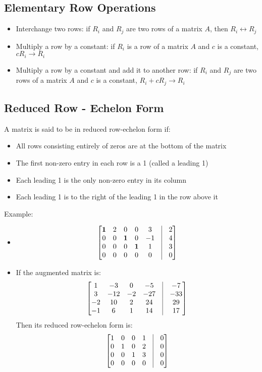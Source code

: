 \documentclass{article}
\begin{document}
\subsection*{Elementary Row Operations}
\begin{itemize}
    \item Interchange two rows: if $R_i$ and $R_j$ are two rows of a matrix $A$, then $R_i \leftrightarrow R_j$ 
    \item Multiply a row by a constant: if $R_i$ is a row of a matrix $A$ and $c$ is a constant, $cR_i \rightarrow R_i$
    \item Multiply a row by a constant and add it to another row: if $R_i$ and $R_j$ are two rows of a matrix $A$ and $c$ is a constant, $R_i + cR_j \rightarrow R_i$
\end{itemize}

\subsection*{Reduced Row - Echelon Form}
A matrix is said to be in reduced row-echelon form if:
\begin{itemize}
    \item All rows consisting entirely of zeros are at the bottom of the matrix
    \item The first non-zero entry in each row is a 1 (called a leading 1)
    \item Each leading 1 is the only non-zero entry in its column
    \item Each leading 1 is to the right of the leading 1 in the row above it
\end{itemize}
Example:
\begin{itemize}
    \item \[\begin{bmatrix}
    \textbf{1} & 2 & 0 & 0 & 3 & \vline & 2 \\
    0 & 0 & \textbf{1} & 0 & -1 & \vline & 4\\
    0 & 0 & 0 & \textbf{1} & 1 & \vline & 3 \\
    0 & 0 & 0 & 0 & 0 & \vline & 0
    \end{bmatrix}\]
    \item If the augmented matrix is: 
    \[\begin{bmatrix}
        1 & -3 & 0 & -5 & \vline & -7 \\
        3 & -12 & -2 & -27 & \vline & -33 \\
        -2 & 10 & 2 & 24 & \vline & 29 \\
        -1 & 6 & 1 & 14 & \vline & 17 \\
    \end{bmatrix}\]
    Then its reduced row-echelon form is:
    \[\begin{bmatrix}
        1 & 0 & 0 & 1 & \vline & 0 \\
        0 & 1 & 0 & 2 & \vline & 0 \\
        0 & 0 & 1 & 3 & \vline & 0 \\
        0 & 0 & 0 & 0 & \vline & 0 \\
    \end{bmatrix}\]
\end{itemize}
\end{document}
